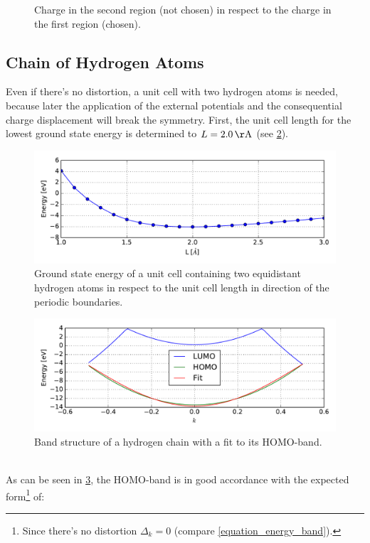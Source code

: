 \begin{figure}
\begin{minipage}{0.49\textwidth}
\caption{Charge in the second region (not chosen) in respect to the charge in the first region (chosen).\\}
\label{image_charge_correlation}
\end{minipage}
\end{figure}

\subsection{Chain of Hydrogen Atoms}
\label{section_hydrogen_chain}
Even if there's no distortion, a unit cell with two hydrogen atoms is needed, because later the application of the external potentials and the consequential charge displacement will break the symmetry. First, the unit cell length for the lowest ground state energy is determined to $L = \unit[2.0]{\AA}$ (see \cref{image_hydrogen_unit_cell_length}).
\begin{figure}[]
	\centering
	\includegraphics[width = 12cm]{Images/Hydrogen/convergence/hydrogen_length}
	\caption{Ground state energy of a unit cell containing two equidistant hydrogen atoms in respect to the unit cell length in direction of the periodic boundaries.}
	\label{image_hydrogen_unit_cell_length}
\end{figure}
\begin{figure}[]
	\centering
	\includegraphics[width = 12cm]{Images/Hydrogen/bands/hydrogen_band_structure}
	\caption{Band structure of a hydrogen chain with a fit to its HOMO-band.}
	\label{image_hydrogen_band_structure}
\end{figure}
\\
As can be seen in \cref{image_hydrogen_band_structure}, the HOMO-band is in good accordance with the expected form\footnote{Since there's no distortion $\Delta_k = 0$ (compare \cref{equation_energy_band}).} of:
